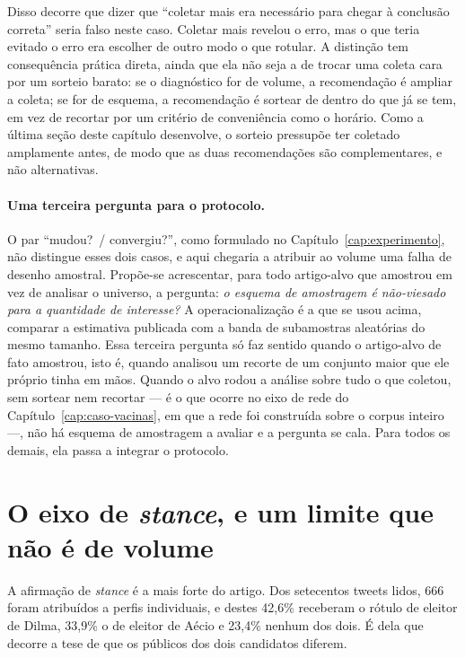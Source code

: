 Disso decorre que dizer que ``coletar mais era necessário para chegar à conclusão
correta'' seria falso neste caso. Coletar mais revelou o erro, mas o que teria
evitado o erro era escolher de outro modo o que rotular. A distinção tem
consequência prática direta, ainda que ela não seja a de trocar uma coleta cara por
um sorteio barato: se o diagnóstico for de volume, a recomendação é ampliar a
coleta; se for de esquema, a recomendação é sortear de dentro do que já se tem, em
vez de recortar por um critério de conveniência como o horário. Como a última
seção deste capítulo desenvolve, o sorteio pressupõe ter coletado amplamente antes,
de modo que as duas recomendações são complementares, e não alternativas.

\paragraph{Uma terceira pergunta para o protocolo.} O par ``mudou?\ / convergiu?'',
como formulado no Capítulo~\ref{cap:experimento}, não distingue esses dois casos, e
aqui chegaria a atribuir ao volume uma falha de desenho amostral. Propõe-se
acrescentar, para todo artigo-alvo que amostrou em vez de analisar o universo, a
pergunta: \emph{o esquema de amostragem é não-viesado para a quantidade de
interesse?} A operacionalização é a que se usou acima, comparar a estimativa
publicada com a banda de subamostras aleatórias do mesmo tamanho. Essa terceira
pergunta só faz sentido quando o artigo-alvo de fato amostrou, isto é, quando
analisou um recorte de um conjunto maior que ele próprio tinha em mãos. Quando o
alvo rodou a análise sobre tudo o que coletou, sem sortear nem recortar --- é o que
ocorre no eixo de rede do Capítulo~\ref{cap:caso-vacinas}, em que a rede foi
construída sobre o corpus inteiro ---, não há esquema de amostragem a avaliar e a
pergunta se cala. Para todos os demais, ela passa a integrar o protocolo.

\section{O eixo de \emph{stance}, e um limite que não é de volume}
\label{sec:stance}

A afirmação de \emph{stance} é a mais forte do artigo. Dos setecentos tweets lidos,
666 foram atribuídos a perfis individuais, e destes 42,6\% receberam o rótulo de
eleitor de Dilma, 33,9\% o de eleitor de Aécio e 23,4\% nenhum dos dois. É dela que
decorre a tese de que os públicos dos dois candidatos diferem.

